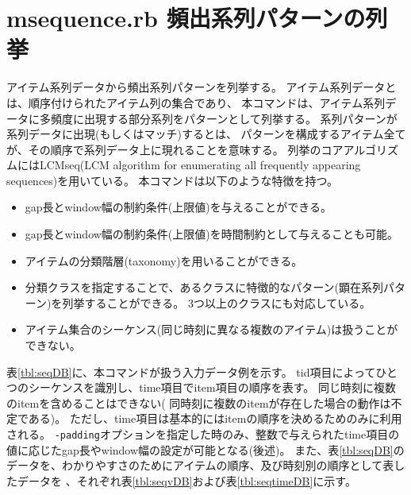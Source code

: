 
\section{msequence.rb 頻出系列パターンの列挙\label{sect:msequence}}
アイテム系列データから頻出系列パターンを列挙する。
アイテム系列データとは、順序付けられたアイテム列の集合であり、
本コマンドは、アイテム系列データに多頻度に出現する部分系列をパターンとして列挙する。
系列パターンが系列データに出現(もしくはマッチ)するとは、
パターンを構成するアイテム全てが、その順序で系列データ上に現れることを意味する。
列挙のコアアルゴリズムにはLCMseq(LCM algorithm for enumerating all frequently appearing sequences)を用いている\cite{UnoWeb}。
本コマンドは以下のような特徴を持つ。
\begin{itemize}
 \item gap長とwindow幅の制約条件(上限値)を与えることができる。
 \item gap長とwindow幅の制約条件(上限値)を時間制約として与えることも可能。
 \item アイテムの分類階層(taxonomy)を用いることができる。
 \item 分類クラスを指定することで、あるクラスに特徴的なパターン(顕在系列パターン)を列挙することができる。
3つ以上のクラスにも対応している。
 \item アイテム集合のシーケンス(同じ時刻に異なる複数のアイテム)は扱うことができない。
\end{itemize}

表\ref{tbl:seqDB}に、本コマンドが扱う入力データ例を示す。
tid項目によってひとつのシーケンスを識別し、time項目でitem項目の順序を表す。
同じ時刻に複数のitemを含めることはできない(
同時刻に複数のitemが存在した場合の動作は不定である)。
ただし、time項目は基本的にはitemの順序を決めるためのみに利用される。
\verb|-padding|オプションを指定した時のみ、整数で与えられたtime項目の値に応じたgap長やwindow幅の設定が可能となる(後述)。
また、表\ref{tbl:seqDB}のデータを、わかりやすさのためにアイテムの順序、及び時刻別の順序として表したデータを
、それぞれ表\ref{tbl:seqvDB}および表\ref{tbl:seqtimeDB}に示す。

